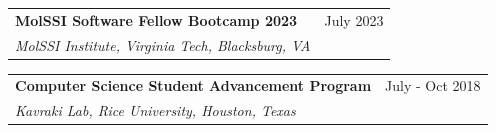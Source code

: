 \documentclass[a4paper,12pt]{article}
\begin{document}
\begin{tabularx}{\linewidth}{ @{}l r@{} }
\textbf{MolSSI Software Fellow Bootcamp 2023} & \hfill \qquad \qquad \qquad \qquad \qquad \qquad  \qquad \qquad \qquad \quad July 2023 \\
\textit{MolSSI Institute, Virginia Tech, Blacksburg, VA} & \\ %
\end{tabularx}


\begin{tabularx}{\linewidth}{ @{}l r@{} }
\textbf{Computer Science Student Advancement Program} & \hfill \qquad \qquad \qquad \qquad \qquad \qquad  July - Oct 2018 \\
\textit{Kavraki Lab, Rice University, Houston, Texas} & \\[3.75pt]
\end{tabularx}
\end{document}
